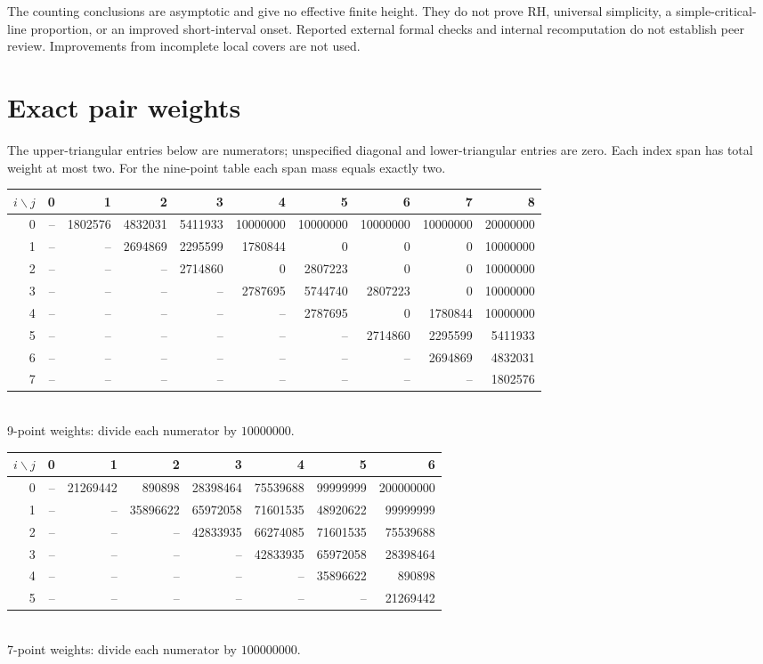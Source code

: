 \documentclass[11pt]{article}
\theoremstyle{remark}\newtheorem{remark}[theorem]{Remark}
\begin{document}
The counting conclusions are asymptotic and give no effective finite height.
They do not prove RH, universal simplicity, a simple-critical-line proportion,
or an improved short-interval onset. Reported external formal checks and
internal recomputation do not establish peer review. Improvements from
incomplete local covers are not used.

\appendix
\section{Exact pair weights}\label{app:weights}
The upper-triangular entries below are numerators; unspecified diagonal and
lower-triangular entries are zero. Each index span has total weight at most
two. For the nine-point table each span mass equals exactly two.

\begin{center}\scriptsize\setlength{\tabcolsep}{3pt}
\begin{tabular}{rrrrrrrrrr}\toprule
$i\backslash j$ & 0 & 1 & 2 & 3 & 4 & 5 & 6 & 7 & 8\\\midrule
0 & -- & 1802576 & 4832031 & 5411933 & 10000000 & 10000000 & 10000000 & 10000000 & 20000000\\
1 & -- & -- & 2694869 & 2295599 & 1780844 & 0 & 0 & 0 & 10000000\\
2 & -- & -- & -- & 2714860 & 0 & 2807223 & 0 & 0 & 10000000\\
3 & -- & -- & -- & -- & 2787695 & 5744740 & 2807223 & 0 & 10000000\\
4 & -- & -- & -- & -- & -- & 2787695 & 0 & 1780844 & 10000000\\
5 & -- & -- & -- & -- & -- & -- & 2714860 & 2295599 & 5411933\\
6 & -- & -- & -- & -- & -- & -- & -- & 2694869 & 4832031\\
7 & -- & -- & -- & -- & -- & -- & -- & -- & 1802576\\
\bottomrule\end{tabular}\\[4pt]
9-point weights: divide each numerator by $10000000$.
\end{center}

\begin{center}\scriptsize\setlength{\tabcolsep}{3pt}
\begin{tabular}{rrrrrrrr}\toprule
$i\backslash j$ & 0 & 1 & 2 & 3 & 4 & 5 & 6\\\midrule
0 & -- & 21269442 & 890898 & 28398464 & 75539688 & 99999999 & 200000000\\
1 & -- & -- & 35896622 & 65972058 & 71601535 & 48920622 & 99999999\\
2 & -- & -- & -- & 42833935 & 66274085 & 71601535 & 75539688\\
3 & -- & -- & -- & -- & 42833935 & 65972058 & 28398464\\
4 & -- & -- & -- & -- & -- & 35896622 & 890898\\
5 & -- & -- & -- & -- & -- & -- & 21269442\\
\bottomrule\end{tabular}\\[4pt]
7-point weights: divide each numerator by $100000000$.
\end{center}
\end{document}
